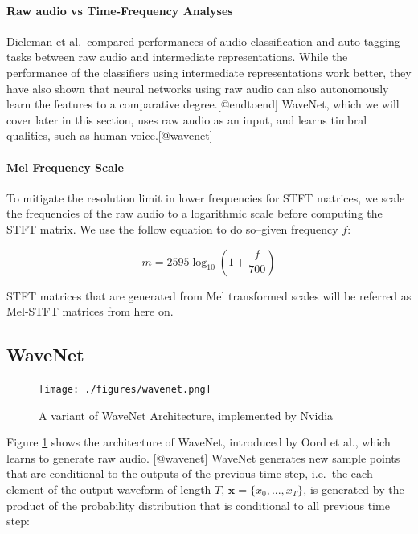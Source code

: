 \documentclass[12pt,a4paper,]{report}
\begin{document}
\paragraph{Raw audio vs Time-Frequency Analyses}

Dieleman et al.~compared performances of audio classification and
auto-tagging tasks between raw audio and intermediate representations.
While the performance of the classifiers using intermediate
representations work better, they have also shown that neural networks
using raw audio can also autonomously learn the features to a
comparative degree.{[}@endtoend{]} WaveNet, which we will cover later in
this section, uses raw audio as an input, and learns timbral qualities,
such as human voice.{[}@wavenet{]}

\paragraph{Mel Frequency Scale}

To mitigate the resolution limit in lower frequencies for STFT matrices,
we scale the frequencies of the raw audio to a logarithmic scale before
computing the STFT matrix. We use the follow equation to do so--given
frequency \(f\):

\begin{equation}
    m = 2595 \log_{10} (1 + \frac{f}{700})
\end{equation}

STFT matrices that are generated from Mel transformed scales will be
referred as Mel-STFT matrices from here on.

\hypertarget{wavenet}{%
\subsection{WaveNet}\label{wavenet}}

\begin{figure}[!h]
    \texttt{[image: ./figures/wavenet.png]}
    \centering
    \caption{A variant of WaveNet Architecture, implemented by Nvidia} \label{fig:wavenet}
\end{figure}

Figure \ref{fig:wavenet} shows the architecture of WaveNet, introduced
by Oord et al., which learns to generate raw audio. {[}@wavenet{]}
WaveNet generates new sample points that are conditional to the outputs
of the previous time step, i.e.~the each element of the output waveform
of length \(T\), \(\mathbf{x} = \{x_0, ..., x_T\}\), is generated by the
product of the probability distribution that is conditional to all
previous time step:
\end{document}
